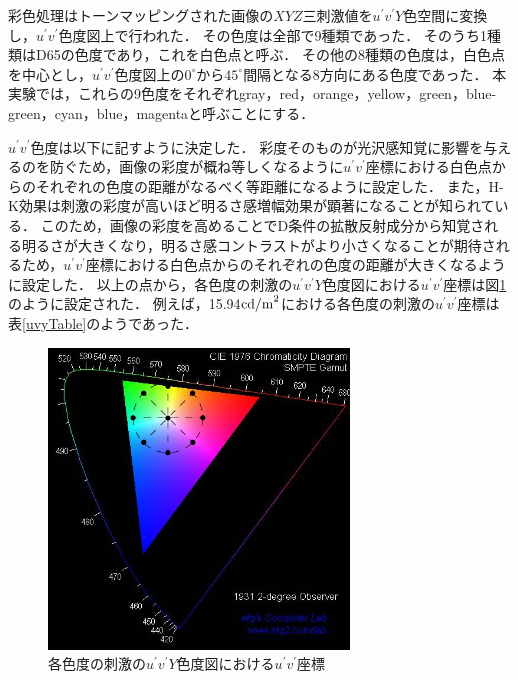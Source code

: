                 彩色処理はトーンマッピングされた画像の$XYZ$三刺激値を$u^{\prime}v^{\prime}Y$色空間に変換し，$u^{\prime}v^{\prime}$色度図上で行われた．
                その色度は全部で9種類であった．
                そのうち1種類はD65の色度であり，これを白色点と呼ぶ．
                その他の8種類の色度は，白色点を中心とし，$u^{\prime}v^{\prime}$色度図上の$0^{\circ}$から$45^{\circ}$間隔となる8方向にある色度であった．
                本実験では，これらの9色度をそれぞれgray，red，orange，yellow，green，blue-green，cyan，blue，magentaと呼ぶことにする．

                $u^{\prime}v^{\prime}$色度は以下に記すように決定した．
                彩度そのものが光沢感知覚に影響を与えるのを防ぐため，画像の彩度が概ね等しくなるように$u^{\prime}v^{\prime}$座標における白色点からのそれぞれの色度の距離がなるべく等距離になるように設定した．
                また，H-K効果は刺激の彩度が高いほど明るさ感増幅効果が顕著になることが知られている．
                このため，画像の彩度を高めることでD条件の拡散反射成分から知覚される明るさが大きくなり，明るさ感コントラストがより小さくなることが期待されるため，$u^{\prime}v^{\prime}$座標における白色点からのそれぞれの色度の距離が大きくなるように設定した．
                以上の点から，各色度の刺激の$u^{\prime}v^{\prime}Y$色度図における$u^{\prime}v^{\prime}$座標は図\ref{uvy}のように設定された\cite{uvYimage}．
                例えば，15.94${\rm cd/m}^2$における各色度の刺激の$u^{\prime}v^{\prime}$座標は表\ref{uvyTable}のようであった．

                \begin{figure}[h]
                    \centering
                    \includegraphics[width=8.0cm]{./img/CIE1976.jpg}
                    \caption{各色度の刺激の$u^{\prime}v^{\prime}Y$色度図における$u^{\prime}v^{\prime}$座標}
                    \label{uvy}
                \end{figure}

